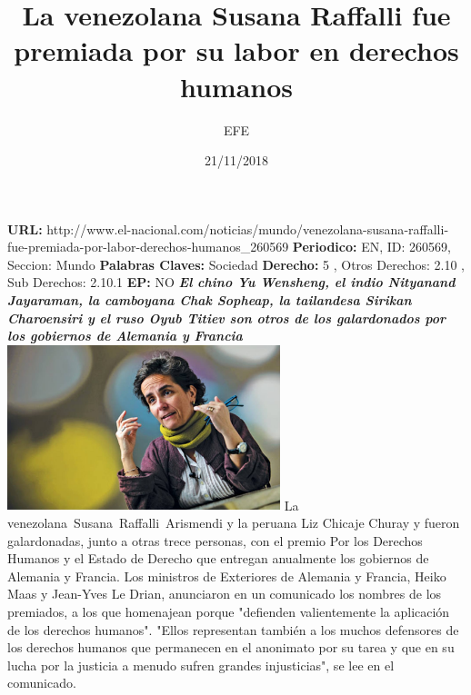 \documentclass{article}%
\title{\textbf{La venezolana Susana Raffalli fue premiada por su labor en derechos humanos}}%
\author{EFE}%
\date{21/11/2018}%
\begin{document}
%
\normalsize%
\maketitle%
\textbf{URL: }%
http://www.el{-}nacional.com/noticias/mundo/venezolana{-}susana{-}raffalli{-}fue{-}premiada{-}por{-}labor{-}derechos{-}humanos\_260569\newline%
%
\textbf{Periodico: }%
EN, %
ID: %
260569, %
Seccion: %
Mundo\newline%
%
\textbf{Palabras Claves: }%
Sociedad\newline%
%
\textbf{Derecho: }%
5%
, Otros Derechos: %
2.10%
, Sub Derechos: %
2.10.1%
\newline%
%
\textbf{EP: }%
NO\newline%
\newline%
%
\textbf{\textit{El chino Yu Wensheng, el indio Nityanand Jayaraman, la camboyana Chak Sopheap, la tailandesa Sirikan Charoensiri y el ruso Oyub Titiev son otros de los galardonados por los gobiernos de Alemania y Francia}}%
\newline%
\newline%
%
\includegraphics[width=300px]{165.jpg}%
\newline%
%
La venezolana~Susana~Raffalli~Arismendi y la peruana Liz Chicaje Churay y fueron galardonadas, junto a otras trece personas, con el premio Por los Derechos Humanos y el Estado de Derecho que entregan anualmente los gobiernos de Alemania y Francia.%
\newline%
%
Los ministros de Exteriores de Alemania y Francia, Heiko Maas y Jean{-}Yves Le Drian, anunciaron en un comunicado los nombres de los premiados, a los que homenajean porque "defienden valientemente la aplicación de los derechos humanos".%
\newline%
%
"Ellos representan también a los muchos defensores de los derechos humanos que permanecen en el anonimato por su tarea y que en su lucha por la justicia a menudo sufren grandes injusticias", se lee en el comunicado.%
\newline%
\end{document}
